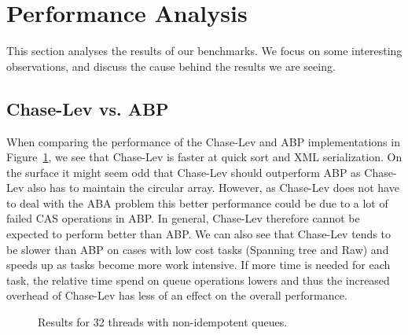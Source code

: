 \section{Performance Analysis}
This section analyses the results of our benchmarks. We focus on some interesting observations, and discuss the cause behind the results we are seeing.
\label{sec:performance_analysis}
\subsection{Chase-Lev vs. ABP}
When comparing the performance of the Chase-Lev and ABP implementations in Figure~\ref{fig:32nonidem}, we see that Chase-Lev is faster at quick sort and XML serialization. On the surface it might seem odd that Chase-Lev should outperform ABP as Chase-Lev also has to maintain the circular array. However, as Chase-Lev does not have to deal with the ABA problem this better performance could be due to a lot of failed CAS operations in ABP\@. In general, Chase-Lev therefore cannot be expected to perform better than ABP\@. We can also see that Chase-Lev tends to be slower than ABP on cases with low cost tasks (Spanning tree and Raw) and speeds up as tasks become more work intensive. If more time is needed for each task, the relative time spend on queue operations lowers and thus the increased overhead of Chase-Lev has less of an effect on the overall performance.

\begin{figure}
\caption{Results for 32 threads with non-idempotent queues.}
\label{fig:32nonidem}
\end{figure}

